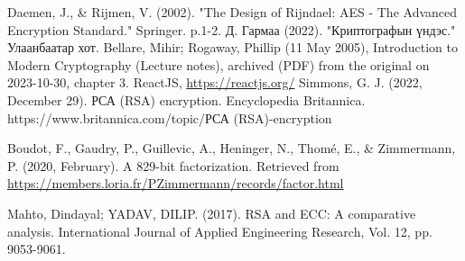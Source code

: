 
\singlespace
{}
\begin{thebibliography}{}
	Daemen, J., \& Rijmen, V. (2002). "The Design of Rijndael: AES - The Advanced Encryption Standard." Springer. p.1-2.
	Д. Гармаа (2022). "Криптографын үндэс." Улаанбаатар хот.
	Bellare, Mihir; Rogaway, Phillip (11 May 2005), Introduction to Modern Cryptography (Lecture notes), archived (PDF) from the original on 2023-10-30, chapter 3.
	ReactJS, \url{https://reactjs.org/}
	Simmons, G. J. (2022, December 29). РСА (RSA) encryption. Encyclopedia Britannica. https://www.britannica.com/topic/РСА (RSA)-encryption

Boudot, F., Gaudry, P., Guillevic, A., Heninger, N., Thomé, E., \& Zimmermann, P. (2020, February). A 829-bit factorization. Retrieved from \url{https://members.loria.fr/PZimmermann/records/factor.html}

Mahto, Dindayal; YADAV, DILIP. (2017). RSA and ECC: A comparative analysis. International Journal of Applied Engineering Research, Vol. 12, pp. 9053-9061.

\end{thebibliography}